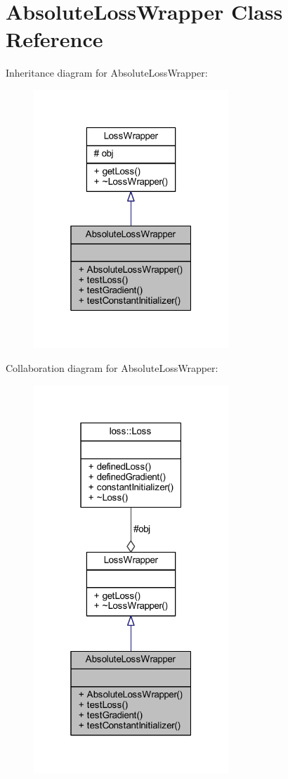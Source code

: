 \hypertarget{class_absolute_loss_wrapper}{}\section{Absolute\+Loss\+Wrapper Class Reference}
\label{class_absolute_loss_wrapper}


Inheritance diagram for Absolute\+Loss\+Wrapper\+:\nopagebreak
\begin{figure}[H]
\begin{center}
\leavevmode
\includegraphics[width=208pt]{class_absolute_loss_wrapper__inherit__graph}
\end{center}
\end{figure}


Collaboration diagram for Absolute\+Loss\+Wrapper\+:\nopagebreak
\begin{figure}[H]
\begin{center}
\leavevmode
\includegraphics[width=208pt]{class_absolute_loss_wrapper__coll__graph}
\end{center}
\end{figure}
